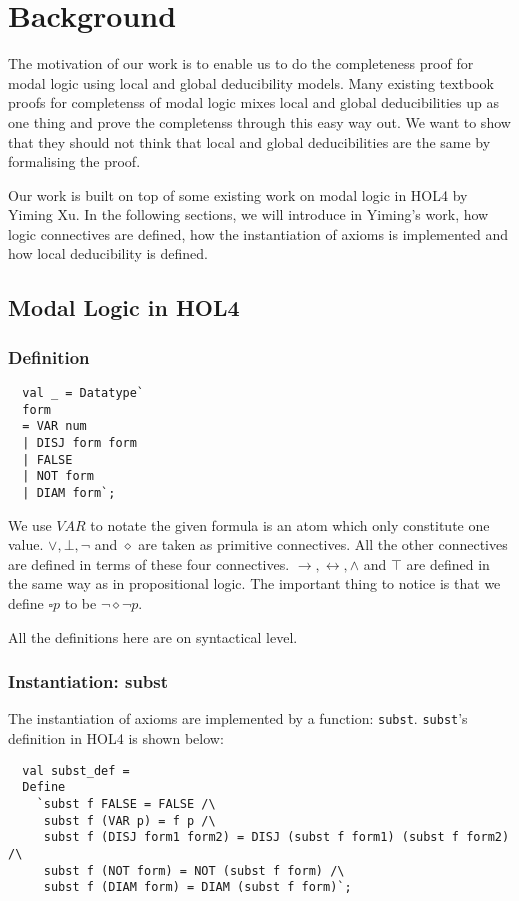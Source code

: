 \documentclass[submission,copyright,creativecommons]{eptcs}
\begin{document}
\section{Background}
The motivation of our work is to enable us to do the 
completeness proof for modal logic using local and global deducibility models. 
Many existing textbook proofs for completenss of modal logic mixes 
local and global deducibilities up as one thing and prove the completenss 
through this easy way out. We want to show that they should not 
think that local and global deducibilities are the same by formalising 
the proof. 

Our work is built on top of some existing work on modal logic in HOL4\cite{yiming} by Yiming Xu.
In the following sections, we will introduce in Yiming's work, how logic connectives 
are defined, how the instantiation of axioms is implemented and how local 
deducibility is defined. 

\subsection{Modal Logic in HOL4}
\subsubsection{Definition}
\label{mldef}
\begin{verbatim}
  val _ = Datatype`
  form
  = VAR num
  | DISJ form form
  | FALSE
  | NOT form
  | DIAM form`;
\end{verbatim}
 
We use $VAR$ to notate the given formula is an atom which only 
constitute one value. 
$\vee, \bot, \neg$ and $\diamond$ are taken as primitive connectives.
All the other connectives are defined in terms of these four connectives.
$\rightarrow, \leftrightarrow, \wedge$ and $\top$ are defined in the same way as 
in propositional logic. The important thing to notice is that we define 
$\square p$ to be $\neg \diamond \neg p$. 

All the definitions here are on syntactical level. 


\subsubsection{Instantiation: subst}
The instantiation of axioms are implemented by a function: \texttt{subst}.
\texttt{subst}'s definition in HOL4 is shown below:
\begin{verbatim}
  val subst_def =
  Define
    `subst f FALSE = FALSE /\
     subst f (VAR p) = f p /\
     subst f (DISJ form1 form2) = DISJ (subst f form1) (subst f form2) /\
     subst f (NOT form) = NOT (subst f form) /\
     subst f (DIAM form) = DIAM (subst f form)`;
\end{verbatim}
\end{document}
